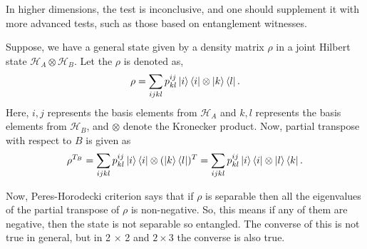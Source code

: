 \documentclass{amsart}
\theoremstyle{plain}
\theoremstyle{definition}
\theoremstyle{plain}
\begin{document}
In higher dimensions, the test is inconclusive, and one should supplement it with more advanced tests, such as those based on entanglement witnesses. 

Suppose, we have a general state given by a density matrix $\rho$ in a joint Hilbert state $\mathcal{H}_A \otimes \mathcal{H}_B$. Let the $\rho $ is denoted as, \begin{equation*}
	\rho = \sum_{ijkl} p^{ij}_{kl} \ket{i}\bra{i}\otimes \ket{k}\bra{l}.
\end{equation*}
Here, $i,j$ represents the basis elements from $\mathcal{H}_A$ and $k,l$ represents the basis elements from $\mathcal{H}_B$, and $\otimes$ denote the Kronecker product. %
Now, partial transpose with respect to $B$ is given as 
\begin{equation*}
	\rho^{T_B} = \sum_{ijkl} p^{ij}_{kl} \ket{i}\bra{i}\otimes (\ket{k}\bra{l})^{T} = \sum_{ijkl} p^{ij}_{kl} \ket{i}\bra{i}\otimes \ket{l}\bra{k}.
\end{equation*}

Now, Peres-Horodecki criterion says that if $\rho$ is separable then all the eigenvalues of the partial transpose of $\rho$ is non-negative. So, this means if any of them are negative, then the state is not separable so entangled. The converse of this is not true in general, but in 2 $\times$ 2 and $2 \times 3$ the converse is also true.
\end{document}
